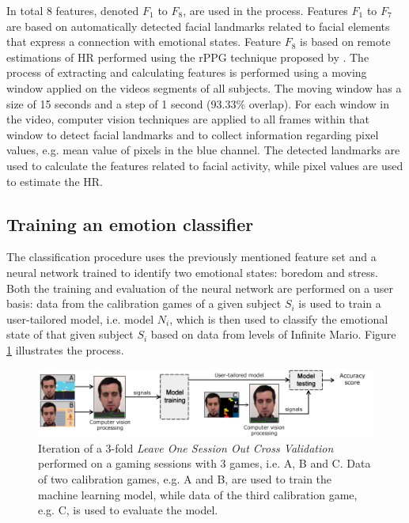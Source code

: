In total 8 features, denoted $F_1$ to $F_8$, are used in the process. Features $F_1$ to $F_7$ are based on automatically detected facial landmarks related to facial elements that express a connection with emotional states. Feature $F_8$ is based on remote estimations of HR performed using the rPPG technique proposed by \textcite{poh2011advancements}. The process of extracting and calculating features is performed using a moving window applied on the videos segments of all subjects. The moving window has a size of 15 seconds and a step of 1 second (93.33\% overlap). For each window in the video, computer vision techniques are applied to all frames within that window to detect facial landmarks and to collect information regarding pixel values, e.g. mean value of pixels in the blue channel. The detected landmarks are used to calculate the features related to facial activity, while pixel values are used to estimate the HR.

\subsection{Training an emotion classifier}

The classification procedure uses the previously mentioned feature set and a neural network trained to identify two emotional states: boredom and stress. Both the training and evaluation of the neural network are performed on a user basis: data from the calibration games of a given subject $S_i$ is used to train a user-tailored model, i.e. model $N_i$, which is then used to classify the emotional state of that given subject $S_i$ based on data from levels of Infinite Mario. Figure \ref{fig:experiment2-training-evaluation} illustrates the process.

\begin{figure}[ht]
    \centering
    \includegraphics[width=\textwidth]{figures/machine-learning-investigation.png}
    \caption{Iteration of a 3-fold \textit{Leave One Session Out Cross Validation} performed on a gaming sessions with 3 games, i.e. A, B and C. Data of two calibration games, e.g. A and B, are used to train the machine learning model, while data of the third calibration game, e.g. C, is used to evaluate the model.}
    \label{fig:experiment2-training-evaluation}
\end{figure}

